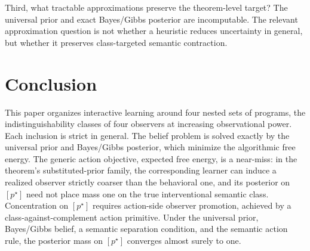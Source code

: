 \documentclass[11pt]{article}
\theoremstyle{definition}
\theoremstyle{remark}
\begin{document}
Third, what tractable approximations preserve the theorem-level target? The universal prior and exact Bayes/Gibbs posterior are incomputable. The relevant approximation question is not whether a heuristic reduces uncertainty in general, but whether it preserves class-targeted semantic contraction.

\section{Conclusion}
\label{sec:conclusion}

This paper organizes interactive learning around four nested sets of programs, the indistinguishability classes of four observers at increasing observational power. Each inclusion is strict in general. The belief problem is solved exactly by the universal prior and Bayes/Gibbs posterior, which minimize the algorithmic free energy. The generic action objective, expected free energy, is a near-miss: in the theorem's substituted-prior family, the corresponding learner can induce a realized observer strictly coarser than the behavioral one, and its posterior on $[p^\star]$ need not place mass one on the true interventional semantic class. Concentration on $[p^\star]$ requires action-side observer promotion, achieved by a class-against-complement action primitive. Under the universal prior, Bayes/Gibbs belief, a semantic separation condition, and the semantic action rule, the posterior mass on $[p^\star]$ converges almost surely to one.



\end{document}
